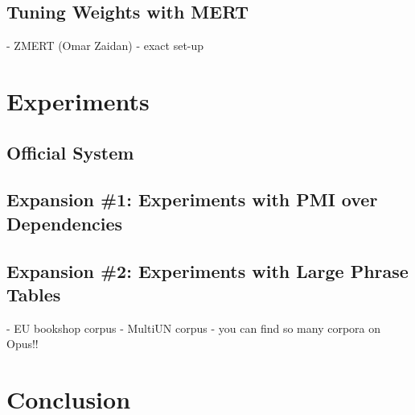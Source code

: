 \documentclass[11pt]{article}
\begin{document}
\subsection{Tuning Weights with MERT}
- ZMERT (Omar Zaidan)
- exact set-up

\section{Experiments}

\subsection{Official System}
\cite{nltkbook}

\subsection{Expansion \#1: Experiments with PMI over Dependencies}

\subsection{Expansion \#2: Experiments with Large Phrase Tables}

- EU bookshop corpus
- MultiUN corpus
- you can find so many corpora on Opus!! \cite{tiedemann:12}

\section{Conclusion} 



\end{document}
